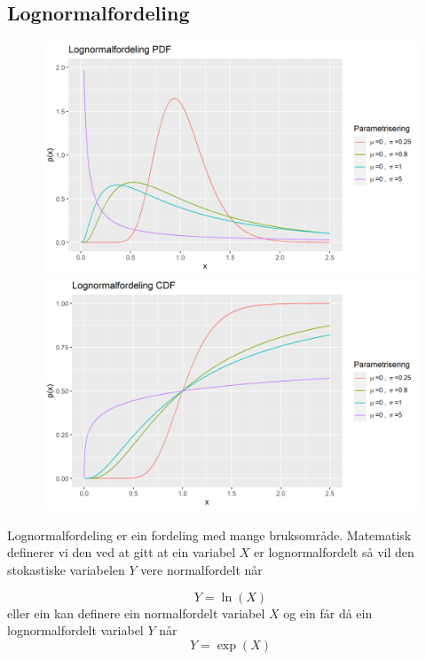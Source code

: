 \subsection{Lognormalfordeling}
\begin{figure}[H]
  \centering
  \begin{minipage}[b]{0.49\textwidth}
\includegraphics[width=\textwidth]{bilete/lognormalpdf.png}
  \end{minipage}
  \hfill
  \begin{minipage}[b]{0.49\textwidth}
    \includegraphics[width=\textwidth]{bilete/lognormalcdf.png}
  \end{minipage}
\end{figure}

Lognormalfordeling er ein fordeling med mange bruksområde. Matematisk definerer vi den ved at gitt at ein variabel $X$ er lognormalfordelt så vil den stokastiske variabelen $Y$ vere normalfordelt når

\begin{equation}
    Y = \ln(X)
\end{equation}
 eller ein kan definere ein normalfordelt variabel $X$ og ein får då ein lognormalfordelt variabel $Y$ når \begin{equation}
     Y = \exp(X)
 \end{equation}

